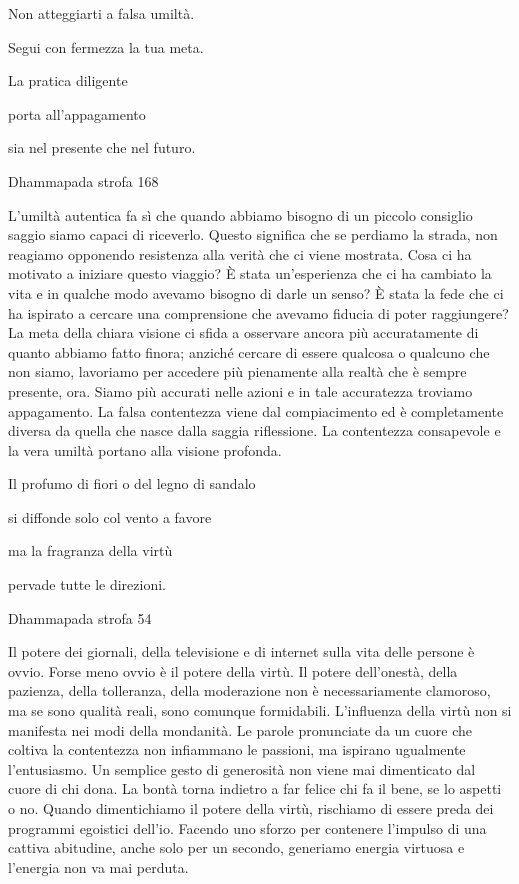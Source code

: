 \documentclass[a4paper,portrait,12pt]{article}
\begin{document}
\newpage



Non atteggiarti a falsa umilt\`{a}.


Segui con fermezza la tua meta.


La pratica diligente


porta all'appagamento


sia nel presente che nel futuro.





Dhammapada strofa 168


\newpage



L'umilt\`{a} autentica fa sì che quando abbiamo bisogno di un piccolo consiglio saggio siamo capaci di riceverlo. Questo significa che se perdiamo la strada, non reagiamo opponendo resistenza alla verit\`{a} che ci viene mostrata. Cosa ci ha motivato a iniziare questo viaggio? \`{E} stata un'esperienza che ci ha cambiato la vita e in qualche modo avevamo bisogno di darle un senso? \`{E} stata la fede che ci ha ispirato a cercare una comprensione che avevamo fiducia di poter raggiungere? La meta della chiara visione ci sfida a osservare ancora più accuratamente di quanto abbiamo fatto finora; anzich\'{e} cercare di essere qualcosa o qualcuno che non siamo, lavoriamo per accedere più pienamente alla realt\`{a} che \`{e} sempre presente, ora. Siamo più accurati nelle azioni e in tale accuratezza troviamo appagamento. La falsa contentezza viene dal compiacimento ed \`{e} completamente diversa da quella che nasce dalla saggia riflessione. La contentezza consapevole e la vera umilt\`{a} portano alla visione profonda.


\newpage



Il profumo di fiori o del legno di sandalo 


si diffonde solo col vento a favore


ma la fragranza della virtù


pervade tutte le direzioni. 





Dhammapada strofa 54


\newpage



Il potere dei giornali, della televisione e di internet sulla vita delle persone \`{e} ovvio. Forse meno ovvio \`{e} il potere della virtù. Il potere dell'onest\`{a}, della pazienza, della tolleranza, della moderazione non \`{e} necessariamente clamoroso, ma se sono qualit\`{a} reali, sono comunque formidabili. L'influenza della virtù non si manifesta nei modi della mondanit\`{a}. Le parole pronunciate da un cuore che coltiva la contentezza non infiammano le passioni, ma ispirano ugualmente l'entusiasmo. Un semplice gesto di generosit\`{a} non viene mai dimenticato dal cuore di chi dona. La bont\`{a} torna indietro a far felice chi fa il bene, se lo aspetti o no. Quando dimentichiamo il potere della virtù, rischiamo di essere preda dei programmi egoistici dell'io. Facendo uno sforzo per contenere l'impulso di una cattiva abitudine, anche solo per un secondo, generiamo energia virtuosa e l'energia non va mai perduta.
\end{document}
